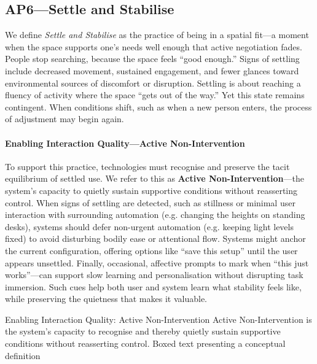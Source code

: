 \subsection{AP6---Settle and Stabilise}
We define \textit{Settle and Stabilise} as the practice of being in a spatial fit---a moment when the space supports one’s needs well enough that active negotiation fades. People stop searching, because the space feels ``good enough.'' Signs of settling include decreased movement, sustained engagement, and fewer glances toward environmental sources of discomfort or disruption. Settling is about reaching a fluency of activity where the space ``gets out of the way.'' Yet this state remains contingent. When conditions shift, such as when a new person enters, the process of adjustment may begin again.

\paragraph{Enabling Interaction Quality---Active Non-Intervention}
To support this practice, technologies must recognise and preserve the tacit equilibrium of settled use. We refer to this as \textbf{Active Non-Intervention}---the system’s capacity to quietly sustain supportive conditions without reasserting control. When signs of settling are detected, such as stillness or minimal user interaction with surrounding automation (e.g. changing the heights on standing desks), systems should defer non-urgent automation (e.g. keeping light levels fixed) to avoid disturbing bodily ease or attentional flow. Systems might anchor the current configuration, offering options like ``save this setup'' until the user appears unsettled. Finally, occasional, affective prompts to mark when ``this just works''---can support slow learning and personalisation without disrupting task immersion. Such cues help both user and system learn what stability feels like, while preserving the quietness that makes it valuable.


\designbox
{Enabling Interaction Quality: Active Non-Intervention}
{Active Non-Intervention is the system’s capacity to recognise and thereby quietly sustain supportive conditions without reasserting control.}
{Boxed text presenting a conceptual definition}


